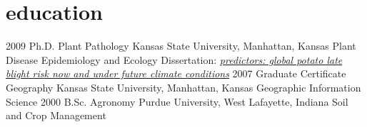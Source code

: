 \section{education}

\begin{entrylist}
  \entry
    {2009}
    {Ph.D. {\normalfont Plant Pathology}}
    {Kansas State University, Manhattan, Kansas}
    {Plant Disease Epidemiology and Ecology}
  \entry
    {}
    {Dissertation: }
    {}
      {\emph{\href{https://krex.k-state.edu/dspace/handle/2097/2341?show=full}{predictors: global potato late blight risk now and under future climate conditions}}}
 \entry
    {2007}
    {Graduate Certificate {\normalfont Geography}}
    {Kansas State University, Manhattan, Kansas}
    {Geographic Information Science}
  \entry
    {2000}
    {B.Sc. {\normalfont Agronomy}}
    {Purdue University, West Lafayette, Indiana}
    {Soil and Crop Management}
\end{entrylist}

